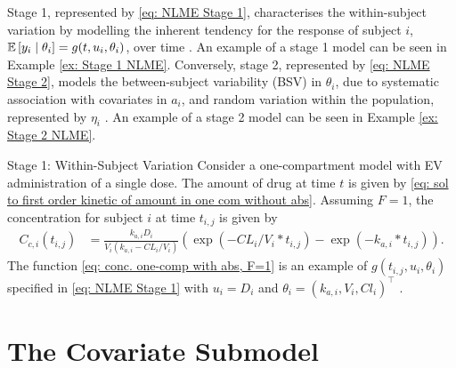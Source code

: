 Stage 1, represented by \eqref{eq: NLME Stage 1}, characterises the within-subject variation by modelling the inherent tendency for the response of subject $i$, $\mathbb{E}\left[{y_{i} \mid \theta_i}\right] = g(t,u_i,\theta_i)$, over time \citep[pp. 395-396]{Davidian2003}. An example of a stage 1 model can be seen in Example \ref{ex: Stage 1 NLME}. Conversely, stage 2, represented by \eqref{eq: NLME Stage 2}, models the between-subject variability (BSV) in $\theta_i$, due to systematic association with covariates in $a_i$, and random variation within the population, represented by $\eta_i$ \citep[p. 393]{Davidian2003}. An example of a stage 2 model can be seen in Example \ref{ex: Stage 2 NLME}. 

\begin{exmp}{Stage 1: Within-Subject Variation}
Consider a one-compartment model with EV administration of a single dose. The amount of drug at time $t$ is given by \eqref{eq: sol to first order kinetic of amount in one com without abs}. Assuming $F=1$, the concentration for subject $i$ at time $t_{i,j}$ is given by 
\begin{align}
        C_{c,i}(t_{i,j}) &= \frac{k_{a,i} D_i}{V_{i}(k_{a,i} - CL_i/V_{i})} \left( \exp(-CL_i/V_{i} * t_{i,j}) - \exp(-k_{a,i} * t_{i,j}) \right).\label{eq: conc. one-comp with abs, F=1}
\end{align}
The function \eqref{eq: conc. one-comp with abs, F=1} is an example of  $g(t_{i,j}, u_i, \theta_i)$ specified in \eqref{eq: NLME Stage 1} with $u_i=D_i$ and $\theta_i=(k_{a,i}, V_{i}, Cl_i)^\top$ \citep[pp. 388-389]{Davidian2003}. 
\label{ex: Stage 1 NLME}
\end{exmp}

\section{The Covariate Submodel} \label{sec: covariate model}




